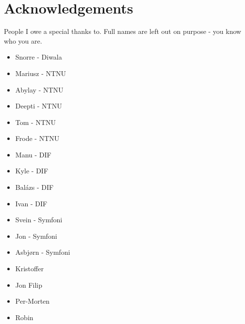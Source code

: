 \chapter*{Acknowledgements}

People I owe a special thanks to. Full names are left out on purpose - you know who you are.

\begin{itemize}
\tightlist
\item
    Snorre - Diwala
\item
    Mariusz - NTNU
\item
    Abylay - NTNU
\item
    Deepti - NTNU
\item
    Tom - NTNU
\item
    Frode - NTNU
\item
    Manu - DIF
\item
    Kyle - DIF
\item
    Balázs - DIF
\item
    Ivan - DIF
\item
    Svein - Symfoni
\item
    Jon - Symfoni
\item
    Asbjørn - Symfoni
\item
    Kristoffer
\item
    Jon Filip
\item
    Per-Morten
\item
    Robin
\end{itemize}
